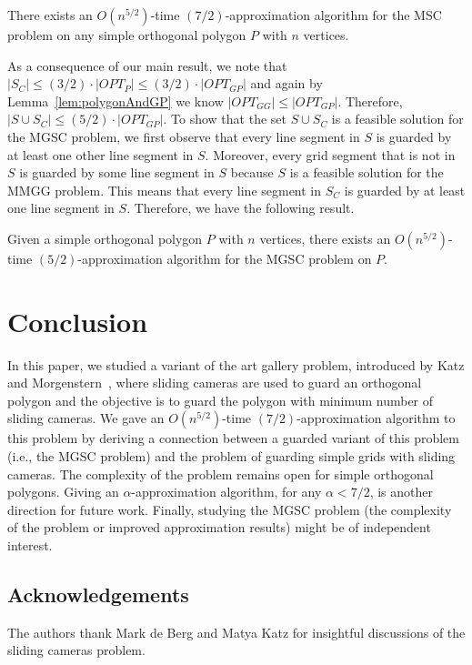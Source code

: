 \documentclass{llncs}
\begin{document}
\begin{theorem}
\label{thm:msc3Approx}
There exists an $O(n^{5/2})$-time $(7/2)$-approximation algorithm for the MSC problem on any simple orthogonal polygon $P$ with $n$ vertices.
\end{theorem}

As a consequence of our main result, we note that $\lvert S_C\rvert\leq (3/2) \cdot \lvert OPT_P\rvert \leq (3/2) \cdot\lvert OPT_{GP}\rvert$ and again by Lemma~\ref{lem:polygonAndGP} we know $\lvert OPT_{GG}\rvert\leq \lvert OPT_{GP}\rvert$. Therefore, $\lvert S\cup S_C\rvert\leq (5/2) \cdot\lvert OPT_{GP}\rvert$. To show that the set $S\cup S_C$ is a feasible solution for the MGSC problem, we first observe that every line segment in $S$ is guarded by at least one other line segment in $S$. Moreover, every grid segment that is not in $S$ is guarded by some line segment in $S$ because $S$ is a feasible solution for the MMGG problem. This means that every line segment in $S_C$ is guarded by at least one line segment in $S$. Therefore, we have the following result.
\begin{corollary}
Given a simple orthogonal polygon $P$ with $n$ vertices, there exists an $O(n^{5/2})$-time $(5/2)$-approximation algorithm for the MGSC problem on $P$.
\end{corollary}

\section{Conclusion}
\label{sec:conclusion}
In this paper, we studied a variant of the art gallery problem, introduced by Katz and Morgenstern~\cite{katz2011},
where sliding cameras are used to guard an orthogonal polygon and the objective is to guard the polygon with
minimum number of sliding cameras. We gave an $O(n^{5/2})$-time $(7/2)$-approximation algorithm to this problem
by deriving a connection between a guarded variant of this problem (i.e., the MGSC problem) and the problem of guarding simple grids with sliding cameras. The complexity of the
problem remains open for simple orthogonal polygons. Giving an $\alpha$-approximation algorithm, for any
$\alpha< 7/2$, is another direction for future work. Finally, studying the MGSC problem (the complexity of the problem or improved approximation results) might be of independent interest.\\


\subsection*{Acknowledgements} The authors thank Mark de Berg and Matya Katz for
insightful discussions of the sliding cameras problem.



\end{document}
